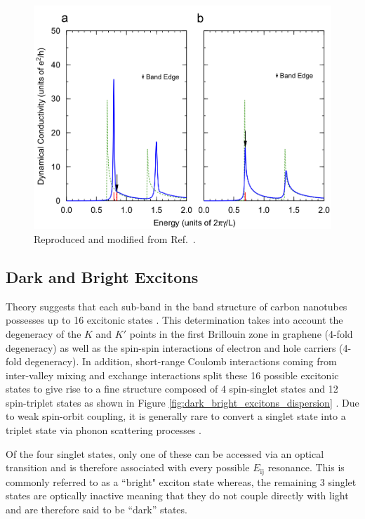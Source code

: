 \begin{figure}[ht]
	\centering
	\includegraphics[scale=1.8]{images/chapter_optical_props/dielectric_ando_3}
	\caption{Reproduced and modified from Ref.\ \cite{ando2011effects}.}
\end{figure}

\clearpage

\subsection{Dark and Bright Excitons}

Theory suggests that each sub-band in the band structure of carbon nanotubes possesses up to 16 excitonic states \cite{amori2018excitons}. This determination takes into account the degeneracy of the $K$ and $K'$ points in the first Brillouin zone in graphene (4-fold degeneracy) as well as the spin-spin interactions of electron and hole carriers (4-fold degeneracy). In addition, short-range Coulomb interactions coming from inter-valley mixing and exchange interactions split these 16 possible excitonic states to give rise to a fine structure composed of 4 spin-singlet states and 12 spin-triplet states as shown in Figure \ref{fig:dark_bright_excitons_dispersion} \cite{ando2006effects}. Due to weak spin-orbit coupling, it is generally rare to convert a singlet state into a triplet state via phonon scattering processes \cite{amori2018excitons}.

Of the four singlet states, only one of these can be accessed via an optical transition and is therefore associated with every possible $E_\text{ij}$ resonance. This is commonly referred to as a ``bright" exciton state whereas, the remaining 3 singlet states are optically inactive meaning that they do not couple directly with light and are therefore said to be ``dark'' states.

